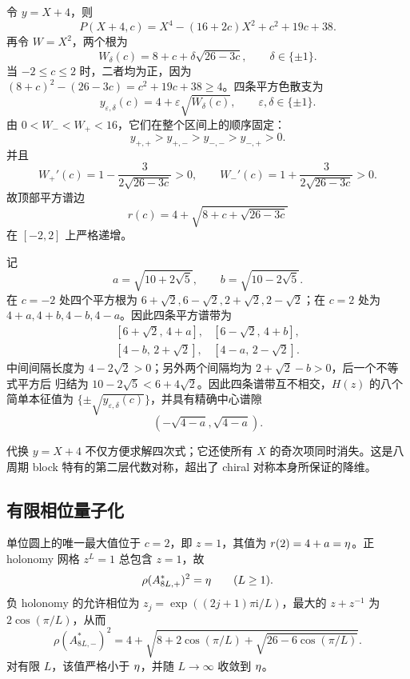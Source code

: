 令 $y=X+4$，则
\begin{equation}
 P(X+4,c)=X^4-(16+2c)X^2+c^2+19c+38.
 \label{eq:centered-quartic}
\end{equation}
再令 $W=X^2$，两个根为
\begin{equation}
 W_\delta(c)=8+c+\delta\sqrt{26-3c},\qquad\delta\in\{\pm1\}.
 \label{eq:w-branches}
\end{equation}
当 $-2\leq c\leq2$ 时，二者均为正，因为
$(8+c)^2-(26-3c)=c^2+19c+38\geq4$。四条平方色散支为
\begin{equation}
 y_{\varepsilon,\delta}(c)=4+\varepsilon\sqrt{W_\delta(c)},
 \qquad\varepsilon,\delta\in\{\pm1\}.
 \label{eq:four-squared-branches}
\end{equation}
由 $0<W_-<W_+<16$，它们在整个区间上的顺序固定：
\[
 y_{+,+}>y_{+,-}>y_{-,-}>y_{-,+}>0.
\]
并且
\[
 W_+'(c)=1-\frac{3}{2\sqrt{26-3c}}>0,\qquad
 W_-'(c)=1+\frac{3}{2\sqrt{26-3c}}>0.
\]
故顶部平方谱边
\begin{equation}
 r(c)=4+\sqrt{8+c+\sqrt{26-3c}}
 \label{eq:top-dispersion}
\end{equation}
在 $[-2,2]$ 上严格递增。

记
\[
 a=\sqrt{10+2\sqrt5},\qquad b=\sqrt{10-2\sqrt5}.
\]
在 $c=-2$ 处四个平方根为
$6+\sqrt2,6-\sqrt2,2+\sqrt2,2-\sqrt2$；在 $c=2$ 处为
$4+a,4+b,4-b,4-a$。因此四条平方谱带为
\begin{equation}
\begin{array}{ll}
[6+\sqrt2,\,4+a],&[6-\sqrt2,\,4+b],\\
{}[4-b,\,2+\sqrt2],&[4-a,\,2-\sqrt2].
\end{array}
\label{eq:squared-bands}
\end{equation}
中间间隔长度为 $4-2\sqrt2>0$；另外两个间隔均为 $2+\sqrt2-b>0$，后一个不等式平方后
归结为 $10-2\sqrt5<6+4\sqrt2$。因此四条谱带互不相交，$H(z)$ 的八个简单本征值为
$\{\pm\sqrt{y_{\varepsilon,\delta}(c)}\}$，并具有精确中心谱隙
\begin{equation}
 \left(-\sqrt{4-a},\sqrt{4-a}\right).
 \label{eq:central-gap}
\end{equation}

代换 $y=X+4$ 不仅方便求解四次式；它还使所有 $X$ 的奇次项同时消失。这是八周期 block
特有的第二层代数对称，超出了 chiral 对称本身所保证的降维。

\subsection{有限相位量子化}

单位圆上的唯一最大值位于 $c=2$，即 $z=1$，其值为
$r(2)=4+a=\eta$。正 holonomy 网格 $z^L=1$ 总包含 $z=1$，故
\begin{equation}
 \rho(A_{8L,+}^{*})^2=\eta\qquad(L\geq1).
 \label{eq:positive-finite-exact}
\end{equation}
负 holonomy 的允许相位为
$z_j=\exp((2j+1)\pi\mathrm i/L)$，最大的 $z+z^{-1}$ 为
$2\cos(\pi/L)$，从而
\begin{equation}
 \rho(A_{8L,-}^{*})^2
 =4+\sqrt{8+2\cos(\pi/L)+\sqrt{26-6\cos(\pi/L)}}.
 \label{eq:negative-finite-exact}
\end{equation}
对有限 $L$，该值严格小于 $\eta$，并随 $L\to\infty$ 收敛到 $\eta$。

